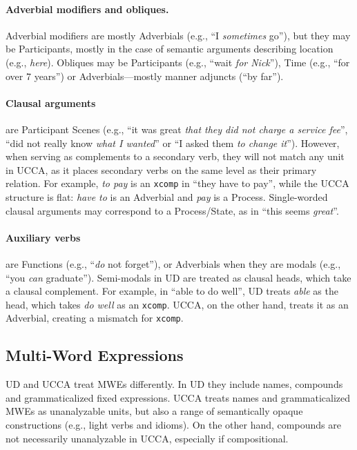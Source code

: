 \documentclass[11pt,a4paper]{article}
\begin{document}
\paragraph{Adverbial modifiers and obliques.}
    Adverbial modifiers are mostly Adverbials (e.g., ``I \textit{sometimes} go''),
    but they may be Participants, mostly in the case of semantic arguments describing location (e.g., \textit{here}).
    Obliques
    may be
    Participants (e.g., ``wait \textit{for Nick}''), Time (e.g., ``for over 7 years'') 
    or Adverbials---mostly manner adjuncts (``by far'').

\paragraph{Clausal arguments}
    are Participant Scenes
    (e.g., ``it was great \textit{that they did not charge a service fee}'',
    ``did not really know \textit{what I wanted}'' or
    ``I asked them \textit{to change it}'').
    However, when serving as complements to a secondary verb, they
    will not match any unit in UCCA, as it places secondary verbs on the 
    same level as their primary relation. 
    For example, \textit{to pay} is an \texttt{xcomp} in ``they have to pay'', while
    the UCCA structure is flat: \textit{have to} is an Adverbial and \textit{pay} is a Process.
    Single-worded clausal arguments may correspond to a Process/State,
    as in ``this seems \textit{great}''.

\paragraph{Auxiliary verbs}
    are Functions (e.g., ``\textit{do} not forget''),
    or Adverbials when they are modals (e.g., ``you \textit{can} graduate''). Semi-modals 
    in UD are treated as clausal heads, which take a clausal complement. 
    For example, in ``able to do well'', UD treats \textit{able} as the head,
    which takes \textit{do well} as an \texttt{xcomp}. UCCA, on the other hand,
    treats it as an Adverbial, creating a mismatch for \texttt{xcomp}.
    

\subsection{Multi-Word Expressions}\label{sec:mwe}

UD and UCCA treat MWEs differently.
In UD they include names, compounds and grammaticalized fixed expressions.
UCCA treats names and grammaticalized MWEs as unanalyzable units,
but also a range of semantically opaque constructions
(e.g., light verbs and idioms).
On the other hand, compounds are not necessarily unanalyzable in UCCA,
especially if compositional.
\end{document}
